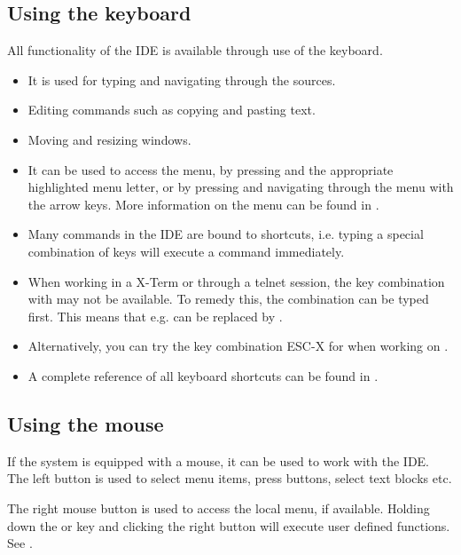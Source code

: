 \subsection{Using the keyboard}
All functionality of the IDE is available through use of the keyboard.
\begin{itemize}
\item It is used for typing and navigating through the sources.
\item Editing commands such as copying and pasting text.
\item Moving and resizing windows.
\item It can be used to access the menu, by pressing  and the
appropriate highlighted menu letter, or by pressing  and
navigating through the menu with the arrow keys.
More information on the menu can be found in .
\item Many commands in the IDE are bound to shortcuts, i.e. typing a special
combination of keys will execute a command immediately.
\end{itemize}
\begin{remark}
\begin{itemize}
\item When working in a \linux X-Term or through a telnet session, the
key combination with  may not be available. To remedy this, the
 combination can be typed first. This means that e.g. 
can be replaced by .
\item Alternatively, you can try the key combination ESC-X for 
when working on \linux.
\item A complete reference of all keyboard shortcuts can be found in
.
\end{itemize}
\end{remark}
%
%
\subsection{Using the mouse}
\label{suse:mouseusage}
If the system is equipped with a mouse, it can be used to work with the
IDE. The left button is used to select menu items, press buttons, select
text blocks etc.

The right mouse button is used to access the local menu, if available.
Holding down the  or  key and clicking the right
button will execute user defined functions. See .

